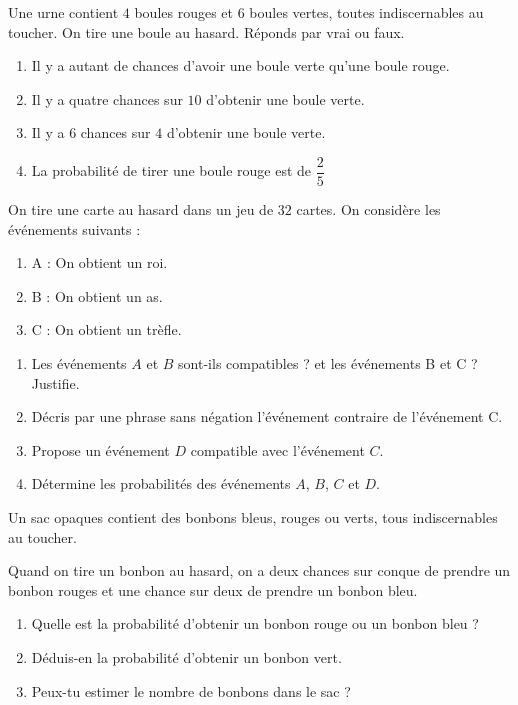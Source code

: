 \documentclass[a4paper,10pt]{report}
\begin{document}
\begin{ex}
Une urne contient $4$ boules rouges et $6$ boules vertes, toutes indiscernables au toucher. On tire une boule au hasard. Réponds par vrai ou faux.

\begin{enumerate}[font=\color{exer1}]
\item Il y a autant de chances d'avoir une boule verte qu'une boule rouge.
\item Il y a quatre chances sur $10$ d'obtenir une boule verte. 
\item Il y a $6$ chances sur $4$ d'obtenir une boule verte.
\item La probabilité de tirer une boule rouge est de $\dfrac{2}{5}$
\end{enumerate}
\end{ex}

\begin{ex}
On tire une carte au hasard dans un jeu de $32$ cartes. On considère les événements suivants :
\begin{enumerate}
\item[•] A : \og On obtient un roi. \fg{} 
\item[•] B : \og On obtient un as. \fg{} 
\item[•] C : \og On obtient un trèfle. \fg{} 
\end{enumerate}

\begin{enumerate}[font=\color{exer2}]
\item Les événements $A$ et $B$ sont-ils compatibles ? et les événements B et C ? Justifie.
\item Décris par une phrase sans négation l'événement contraire de l'événement C.
\item Propose un événement $D$ compatible avec l'événement $C$.
\item Détermine les probabilités des événements $A$, $B$, $C$ et $D$.
\end{enumerate}
\end{ex}

\begin{ex}
Un sac opaques contient des bonbons bleus, rouges ou verts, tous indiscernables au toucher.

\noindent Quand on tire un bonbon au hasard, on a deux chances sur conque de prendre un bonbon rouges et une chance sur deux de prendre un bonbon bleu.

\begin{enumerate}[font=\color{exer2}]
\item Quelle est la probabilité d'obtenir un bonbon rouge ou un bonbon bleu ?
\item Déduis-en la probabilité d'obtenir un bonbon vert.
\item Peux-tu estimer le nombre de bonbons dans le sac ?
\end{enumerate}
\end{ex}
\end{document}
